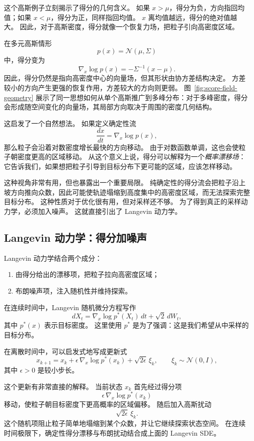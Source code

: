 这个高斯例子立刻揭示了得分的几何含义。
如果 $x>\mu$，得分为负，方向指回均值；如果 $x<\mu$，得分为正，同样指回均值。
$x$ 离均值越远，得分的绝对值越大。
因此，对于高斯密度，得分就像一个恢复力场，把粒子引向高密度区域。

在多元高斯情形
\[
p(x)=\mathcal{N}(\mu,\Sigma)
\]
中，得分变为
\[
\boxed{
\nabla_x \log p(x)
=
-\Sigma^{-1}(x-\mu).
}
\]
因此，得分仍然是指向高密度中心的向量场，但其形状由协方差结构决定。
方差较小的方向产生更强的恢复作用，方差较大的方向则更弱。
图~\ref{fig:score-field-geometry} 展示了同一思想如何从单个高斯推广到多峰分布：对于多峰密度，得分会形成随空间变化的向量场，其局部方向取决于周围的密度几何结构。



这启发了一个自然想法。
如果定义确定性流
\[
\frac{dx}{dt}
=
\nabla_x \log p(x),
\]
那么粒子会沿着对数密度增长最快的方向移动。
由于对数函数单调，这也会使粒子朝密度更高的区域移动。
从这个意义上说，得分可以解释为一个\emph{概率漂移场}：它告诉我们，如果想把粒子引导到目标分布下更可能的区域，应该怎样移动。

这种视角非常有用，但也暴露出一个重要局限。
纯确定性的得分流会把粒子沿上坡方向推向众数，因此可能使轨迹塌缩到高度集中的高密度区域，而无法探索完整目标分布。
这种性质对于优化很有用，但对采样还不够。
为了得到真正的采样动力学，必须加入噪声。
这就直接引出了 Langevin 动力学。

\subsection{Langevin 动力学：得分加噪声}

Langevin 动力学结合两个成分：
\begin{enumerate}
    \item 由得分给出的漂移项，把粒子拉向高密度区域；
    \item 布朗噪声项，注入随机性并维持探索。
\end{enumerate}

在连续时间中，Langevin 随机微分方程写作
\[
\boxed{
dX_t
=
\nabla_x \log p^\ast(X_t)\,dt
+
\sqrt{2}\,dW_t,
}
\]
其中 $p^\ast(x)$ 表示目标密度。
这里使用 $p^\ast$ 是为了强调：这是我们希望从中采样的目标分布。

在离散时间中，可以启发式地写成更新式
\[
\boxed{
x_{k+1}
=
x_k
+
\epsilon\,\nabla_x \log p^\ast(x_k)
+
\sqrt{2\epsilon}\,\xi_k,
\qquad
\xi_k\sim\mathcal{N}(0,I),
}
\]
其中 $\epsilon>0$ 是较小步长。

这个更新有非常直接的解释。
当前状态 $x_k$ 首先经过得分项
\[
\epsilon\,\nabla_x \log p^\ast(x_k)
\]
移动，使粒子朝目标密度下更高概率的区域偏移。
随后加入高斯扰动
\[
\sqrt{2\epsilon}\,\xi_k.
\]
这个随机项阻止粒子简单地塌缩到某个众数，并让它继续探索状态空间。
在连续时间极限下，确定性得分漂移与布朗扰动结合成上面的 Langevin SDE。


